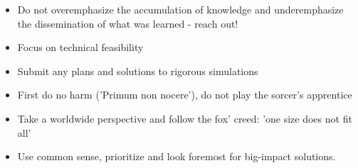 \begin{itemize}
    \item Do not overemphasize the accumulation of knowledge and underemphasize
        the dissemination of what was learned - reach out!
    \item Focus on technical feasibility
    \item Submit any plans and solutions to rigorous simulations
    \item First do no harm ('Primum non nocere'), do not play the sorcer's
        apprentice
    \item Take a worldwide perspective and follow the fox' creed: 'one size
        does not fit all'
    \item Use common sense, prioritize and look foremost for big-impact
        solutions.
\end{itemize}

